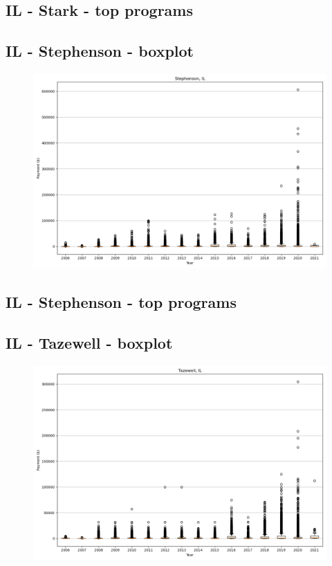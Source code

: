 \subsection*{IL - Stark - top programs}

\newpage
\subsection*{IL - Stephenson - boxplot}
\begin{figure}[h]
\centering
\includegraphics[width=7in]{../output/boxplots/counties/Stephenson-IL_boxplot.png}
\end{figure}


\subsection*{IL - Stephenson - top programs}

\newpage
\subsection*{IL - Tazewell - boxplot}
\begin{figure}[h]
\centering
\includegraphics[width=7in]{../output/boxplots/counties/Tazewell-IL_boxplot.png}
\end{figure}


